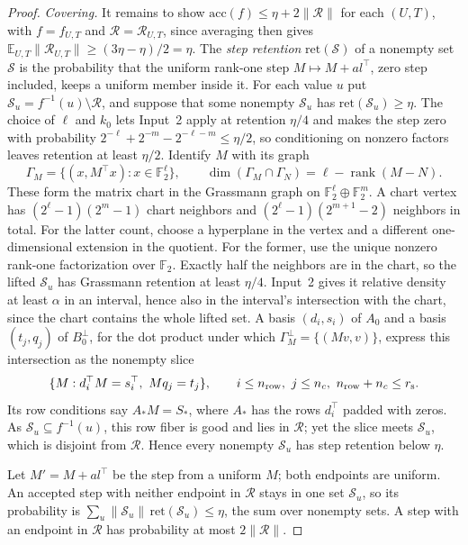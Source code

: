 \documentclass[11pt]{article}
\newcommand{\E}{\mathbb E}
\newcommand{\F}{\mathbb F}
\newcommand{\rank}{\operatorname{rank}}
\begin{document}
\begin{proof}
\emph{Covering.} It remains to show $\mathrm{acc}(f)\le\eta+2\|\mathcal R\|$
for each $(U,T)$, with $f=f_{U,T}$ and $\mathcal R=\mathcal R_{U,T}$, since
averaging then gives $\E_{U,T}\|\mathcal R_{U,T}\|\ge(3\eta-\eta)/2=\eta$.
The \emph{step retention} $\mathrm{ret}(\mathcal S)$ of a nonempty set
$\mathcal S$ is the probability that the uniform rank-one step
$M\mapsto M+al^\top$, zero step included, keeps a uniform member inside
it. For each value $u$ put $\mathcal S_u=f^{-1}(u)\setminus\mathcal R$, and
suppose that some nonempty $\mathcal S_u$ has $\mathrm{ret}(\mathcal S_u)\ge\eta$.
The choice of $\ell$ and $k_0$ lets Input~2 apply at retention $\eta/4$
and makes the step zero with probability
$2^{-\ell}+2^{-m}-2^{-\ell-m}\le\eta/2$, so conditioning on nonzero factors
leaves retention at least $\eta/2$. Identify $M$ with its graph
\[
 \Gamma_M=\{(x,M^\top x):x\in\F_2^\ell\},\qquad
 \dim(\Gamma_M\cap \Gamma_N)=\ell-\rank(M-N).
\]
These form the matrix chart in the Grassmann graph on
$\F_2^\ell\oplus\F_2^m$. A chart vertex has
$(2^\ell-1)(2^m-1)$ chart neighbors and
$(2^\ell-1)(2^{m+1}-2)$ neighbors in total. For the latter count, choose
a hyperplane in the vertex and a different one-dimensional extension in
the quotient. For the former, use the unique nonzero rank-one
factorization over $\F_2$. Exactly half the neighbors are in the chart,
so the lifted $\mathcal S_u$ has Grassmann retention at least $\eta/4$.
Input~2 gives it relative density at least $\alpha$ in an interval, hence also in
the interval's intersection with the chart, since the chart contains the whole lifted set.
A basis $(d_i,s_i)$ of $A_0$ and a basis $(t_j,q_j)$ of $B_0^\perp$, for the
dot product under which $\Gamma_M^\perp=\{(Mv,v)\}$, express this
intersection as the nonempty slice
\[
 \{M:d_i^\top M=s_i^\top,\ Mq_j=t_j\},
 \qquad i\le n_{\rm row},\ j\le n_c,\ n_{\rm row}+n_c\le r_{\rm s}.
\]
Its row conditions say $A_*M=S_*$, where $A_*$ has the rows $d_i^\top$
padded with zeros. As $\mathcal S_u\subseteq f^{-1}(u)$, this row fiber is
good and lies in $\mathcal R$; yet the slice meets $\mathcal S_u$, which is
disjoint from $\mathcal R$. Hence every nonempty $\mathcal S_u$ has step
retention below $\eta$.

Let $M'=M+al^\top$ be the step from a uniform $M$; both endpoints are
uniform. An accepted step with neither endpoint in $\mathcal R$ stays in
one set $\mathcal S_u$, so its probability is
$\sum_u\|\mathcal S_u\|\,\mathrm{ret}(\mathcal S_u)\le\eta$, the sum over
nonempty sets. A step with an endpoint in $\mathcal R$ has probability at
most $2\|\mathcal R\|$.
\end{proof}
\end{document}
